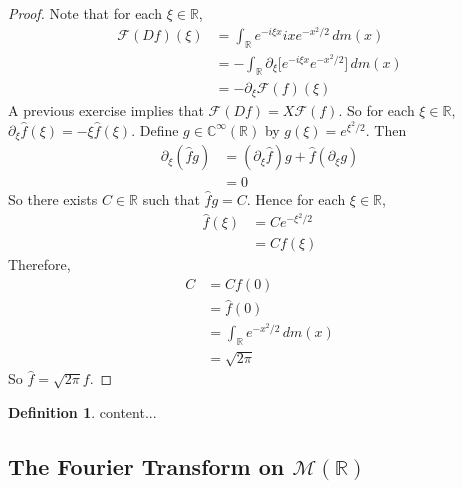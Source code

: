 \documentclass[12pt]{amsart}
\theoremstyle{definition}
\newtheorem{defn}[definition]{Definition}
\newcommand{\p}{\partial}
\newcommand{\C}{\mathbb{C}}
\newcommand{\R}{\mathbb{R}}
\newcommand{\MF}{\mathcal{F}}
\newcommand{\MM}{\mathcal{M}}
\newcommand{\dm}{\, d m}
\begin{document}
	\begin{proof}
		Note that for each $\xi \in \R$, 
		\begin{align*}
			\MF(Df)(\xi) 
			& = \int_{\R} e^{-i \xi x}ixe^{-x^2/2} \dm(x) \\
			& = -\int_{\R}  \p_{\xi} \bigg[ e^{-i \xi x} e^{-x^2/2}\bigg] \dm(x) \\
			& = - \p_{\xi} \MF(f)(\xi) 
		\end{align*}
		A previous exercise implies that $\MF(Df) = X \MF(f)$. So for each $\xi \in \R$, $\p_{\xi} \hat{f}(\xi) = - \xi \hat{f}(\xi)$. Define $g \in \C^{\infty}(\R)$ by $g(\xi) = e^{\xi^2/2}$. Then 
		\begin{align*}
			\p_{\xi} (\hat{f} g) 
			& = (\p_{\xi} \hat{f}) g + \hat{f} (\p_{\xi}g) \\
			& = 0
		\end{align*}
		So there exists $C \in \R$ such that $\hat{f}g = C$. Hence for each $\xi \in \R$, 
		\begin{align*}
			\hat{f}(\xi) 
			& = Ce^{-\xi^2/2} \\
			& = Cf(\xi)
		\end{align*}
		Therefore, 
		\begin{align*}
			C
			& = Cf(0) \\
			& = \hat{f}(0) \\
			& = \int_{\R} e^{-x^2/2} \dm(x) \\
			& = \sqrt{2 \pi} 
		\end{align*}
		So $\hat{f} = \sqrt{2 \pi}f$.
	\end{proof}



	
	


	\begin{defn}
		content...
	\end{defn}
	
	
	
	
	
	
	
	
	
	
	
	
	
	
	
	
	
	
	
	
	\newpage
	\subsection{The Fourier Transform on $\MM(\R)$}
	
\end{document}
